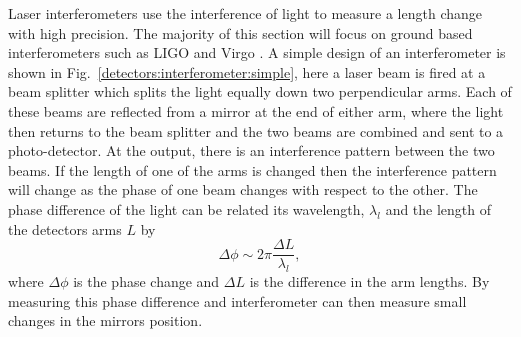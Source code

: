 Laser interferometers use the interference of light to measure a
length change with high precision.  The majority of this
section will focus on ground based interferometers such as \gls{LIGO} and Virgo
\citep{aasi2015AdvancedLIGO,acernese2015AdvancedVirgo}.  A simple design of an
interferometer is shown in Fig.~\ref{detectors:interferometer:simple}, here a laser
beam is fired at a beam splitter which splits the light equally down two
perpendicular arms.  Each of these beams are reflected from a mirror at the end
of either arm, where the light then returns to the beam splitter and the two beams
are combined and sent to a photo-detector.  At the output, there is an
interference pattern between the two beams.  If the length of one of the arms
is changed then the interference pattern will change as the phase of one beam
changes with respect to the other.  The phase difference of the light can be
related its wavelength, $\lambda_l$ and the length of the
detectors arms $L$ by
%
\begin{equation}
\label{intro:detectors:phasechange}
\Delta \phi \sim 2 \pi \frac{\Delta L}{\lambda_l},
\end{equation}
%
where $\Delta
\phi$ is the phase change and $\Delta L$ is the difference in the arm lengths.
By measuring this phase difference and interferometer can then measure small changes in the mirrors position.

